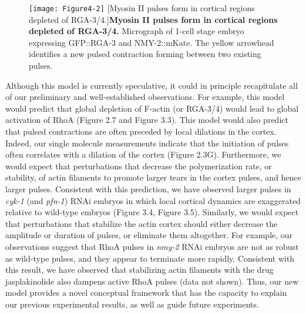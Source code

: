 \documentclass{ucetd}
\begin{document}
\begin{figure}[!htbp]
\centering
\texttt{[image: Figure4-2]}
[Myosin II pulses form in cortical regions depleted of RGA-3/4.]{\textbf{Myosin II pulses form in cortical regions depleted of RGA-3/4.} Micrograph of 1-cell stage embryo expressing GFP::RGA-3 and NMY-2::mKate.  The yellow arrowhead identifies a new pulsed contraction forming between two existing pulses.}
\end{figure}


Although this model is currently speculative, it could in principle recapitulate all of our preliminary and well-established observations.  For example, this model would predict that global depletion of F-actin (or RGA-3/4) would lead to global activation of RhoA (Figure 2.7 and Figure 3.3).  This model would also predict that pulsed contractions are often preceded by local dilations in the cortex.  Indeed, our single molecule measurements indicate that the initiation of pulses often correlates with a dilation of the cortex (Figure 2.3G).  Furthermore, we would expect that perturbations that decrease the polymerization rate, or stability, of actin filaments to promote larger tears in the cortex pulses, and hence larger pulses.  Consistent with this prediction, we have observed larger pulses in \textit{cyk-1} (and \textit{pfn-1}) RNAi embryos in which local cortical dynamics are exaggerated relative to wild-type embryos (Figure 3.4, Figure 3.5).  Similarly, we would expect that perturbations that stabilize the actin cortex should either decrease the amplitude or duration of pulses, or eliminate them altogether.  For example, our observations suggest that RhoA pulses in \textit{nmy-2} RNAi embryos are not as robust as wild-type pulses, and they appear to terminate more rapidly.  Consistent with this result, we have observed that stabilizing actin filaments with the drug jasplakinolide also dampens active RhoA pulses (data not shown).  Thus, our new model provides a novel conceptual framework that has the capacity to explain our previous experimental results, as well as guide future experiments.
\end{document}
